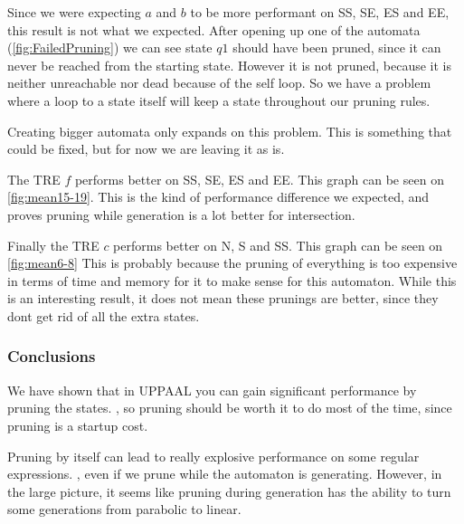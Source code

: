 \resizebox{\columnwidth}{!}{
    
}

\resizebox{\columnwidth}{!}{
    
}
\label{fig:mean3-5}

Since we were expecting $a$ and $b$ to be more performant on SS, SE, ES and EE, this result is not what we expected.
After opening up one of the automata (\cref{fig:FailedPruning}) we can see state $q1$ should have been pruned, since it can never be reached from the starting state.
However it is not pruned, because it is neither unreachable nor dead because of the self loop.
So we have a problem where a loop to a state itself will keep a state throughout our pruning rules.


\label{fig:FailedPruning}

Creating bigger automata only expands on this problem. This is something that could be fixed, but for now we are leaving it as is.

The TRE $f$ performs better on SS, SE, ES and EE.
This graph can be seen on \cref{fig:mean15-19}.
This is the kind of performance difference we expected, and proves pruning while generation is a lot better for intersection.

\resizebox{\columnwidth}{!}{
    
}

\resizebox{\columnwidth}{!}{
    
}
\label{fig:mean15-19}

Finally the TRE $c$ performs better on N, S and SS.
This graph can be seen on \cref{fig:mean6-8}
This is probably because the pruning of everything is too expensive in terms of time and memory for it to make sense for this automaton.
While this is an interesting result, it does not mean these prunings are better, since they dont get rid of all the extra states.

\resizebox{\columnwidth}{!}{
    
}

\resizebox{\columnwidth}{!}{
    
}
\label{fig:mean6-8}

\subsubsection{Conclusions}
We have shown that in UPPAAL you can gain significant performance by pruning the states.
, so pruning should be worth it to do most of the time, since pruning is a startup cost.

Pruning by itself can lead to really explosive performance on some regular expressions.
, even if we prune while the automaton is generating.
However, in the large picture, it seems like pruning during generation has the ability to turn some generations from parabolic to linear.
